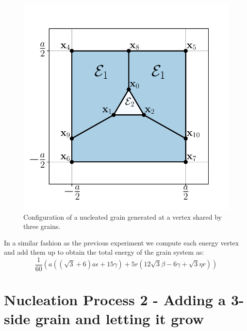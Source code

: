 \begin{figure}
    \centering
    \includegraphics[scale=0.65]{figures/SE_nucleation.pdf}
    \caption{Configuration of a nucleated grain generated at a vertex shared by three grains.}
    \label{fig:SE_nucleation}
\end{figure}

In a similar fashion as the previous experiment we compute each energy vertex and add them up to obtain the total energy of the grain system as:
\begin{equation*}
    \frac{1}{60} \left(a \left(\left(\sqrt{3}+6\right) a \epsilon +15 \gamma \right)+5 r \left(12 \sqrt{3} \beta -6 \gamma +\sqrt{3} \eta  r\right)\right)
\end{equation*}

\section{Nucleation Process 2 - Adding a 3-side grain
and letting it grow}

